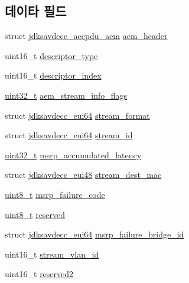 \subsection*{데이타 필드}
\begin{DoxyCompactItemize}
\item 
struct \hyperlink{structjdksavdecc__aecpdu__aem}{jdksavdecc\+\_\+aecpdu\+\_\+aem} \hyperlink{structjdksavdecc__aem__command__get__stream__info__response_ae1e77ccb75ff5021ad923221eab38294}{aem\+\_\+header}
\item 
uint16\+\_\+t \hyperlink{structjdksavdecc__aem__command__get__stream__info__response_ab7c32b6c7131c13d4ea3b7ee2f09b78d}{descriptor\+\_\+type}
\item 
uint16\+\_\+t \hyperlink{structjdksavdecc__aem__command__get__stream__info__response_a042bbc76d835b82d27c1932431ee38d4}{descriptor\+\_\+index}
\item 
\hyperlink{parse_8c_a6eb1e68cc391dd753bc8ce896dbb8315}{uint32\+\_\+t} \hyperlink{structjdksavdecc__aem__command__get__stream__info__response_a01e6193642f6392292ade676656c9118}{aem\+\_\+stream\+\_\+info\+\_\+flags}
\item 
struct \hyperlink{structjdksavdecc__eui64}{jdksavdecc\+\_\+eui64} \hyperlink{structjdksavdecc__aem__command__get__stream__info__response_a77359be54ea386b1da66597746709ed0}{stream\+\_\+format}
\item 
struct \hyperlink{structjdksavdecc__eui64}{jdksavdecc\+\_\+eui64} \hyperlink{structjdksavdecc__aem__command__get__stream__info__response_af4c017686a11885d1d514c21bcde8160}{stream\+\_\+id}
\item 
\hyperlink{parse_8c_a6eb1e68cc391dd753bc8ce896dbb8315}{uint32\+\_\+t} \hyperlink{structjdksavdecc__aem__command__get__stream__info__response_a58ec17b43515ffd62f6380695f8f59b2}{msrp\+\_\+accumulated\+\_\+latency}
\item 
struct \hyperlink{structjdksavdecc__eui48}{jdksavdecc\+\_\+eui48} \hyperlink{structjdksavdecc__aem__command__get__stream__info__response_acb9f6beb748e2b0e9086f809a4b3143d}{stream\+\_\+dest\+\_\+mac}
\item 
\hyperlink{stdint_8h_aba7bc1797add20fe3efdf37ced1182c5}{uint8\+\_\+t} \hyperlink{structjdksavdecc__aem__command__get__stream__info__response_ad3d0b0a294bb35f39b361259730159d7}{msrp\+\_\+failure\+\_\+code}
\item 
\hyperlink{stdint_8h_aba7bc1797add20fe3efdf37ced1182c5}{uint8\+\_\+t} \hyperlink{structjdksavdecc__aem__command__get__stream__info__response_acb7bc06bed6f6408d719334fc41698c7}{reserved}
\item 
struct \hyperlink{structjdksavdecc__eui64}{jdksavdecc\+\_\+eui64} \hyperlink{structjdksavdecc__aem__command__get__stream__info__response_ad53a697054b76cf96ebb0d69a8cf8fb8}{msrp\+\_\+failure\+\_\+bridge\+\_\+id}
\item 
uint16\+\_\+t \hyperlink{structjdksavdecc__aem__command__get__stream__info__response_a8901fae0712dfce7341cdcbe8b43035c}{stream\+\_\+vlan\+\_\+id}
\item 
uint16\+\_\+t \hyperlink{structjdksavdecc__aem__command__get__stream__info__response_a0fc429b055e74830a4583ec37f5c3846}{reserved2}
\end{DoxyCompactItemize}


